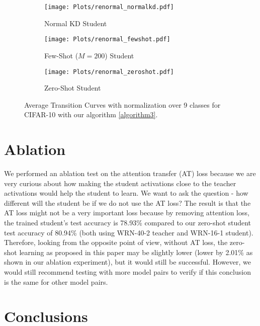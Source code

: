 \documentclass{article}
\begin{document}
\begin{figure}[h!]
  \centering
  \begin{subfigure}[b]{0.32\linewidth}
    \texttt{[image: Plots/renormal\_normalkd.pdf]}
     \caption{Normal KD Student}
  \end{subfigure}
  \begin{subfigure}[b]{0.32\linewidth}
    \texttt{[image: Plots/renormal\_fewshot.pdf]}
    \caption{Few-Shot ($M=200$) Student}
  \end{subfigure}
  \begin{subfigure}[b]{0.32\linewidth}
    \texttt{[image: Plots/renormal\_zeroshot.pdf]}
    \caption{Zero-Shot Student}
  \end{subfigure}
  \caption{Average Transition Curves with normalization over 9 classes for CIFAR-10 with our algorithm \ref{algorithm3}.}
  \label{fig:TCurvesWNormalize}
\end{figure}

\section{Ablation}

We performed an ablation test on the attention transfer (AT) loss because we are very curious about how making the student activations close to the teacher activations would help the student to learn. We want to ask the question - how different will the student be if we do not use the AT loss? The result is that the AT loss might not be a very important loss because by removing attention loss, the trained student's test accuracy is 78.93\% compared to our zero-shot student test accuracy of 80.94\% (both using WRN-40-2 teacher and WRN-16-1 student). Therefore, looking from the opposite point of view, without AT loss, the zero-shot learning as proposed in this paper may be slightly lower (lower by 2.01\% as shown in our ablation experiment), but it would still be successful. However, we would still recommend testing with more model pairs to verify if this conclusion is the same for other model pairs.



\section{Conclusions}
\end{document}
